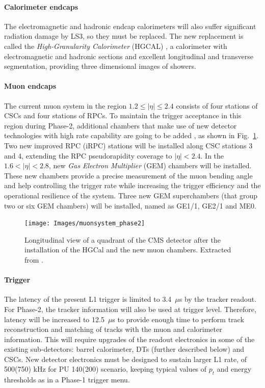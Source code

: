 \documentclass[../main.tex]{subfiles}
\begin{document}
\paragraph{Calorimeter endcaps}

The electromagnetic and hadronic endcap calorimeters will also suffer significant radiation damage by LS3, so they must be replaced. The new replacement is called the \textit{High-Granularity Calorimeter} (HGCAL) \cite{intro:exp:hgcal}, a calorimeter with electromagnetic and hadronic sections and excellent longitudinal and transverse segmentation, providing three dimensional images of showers.

\paragraph{Muon endcaps}

The current muon system in the region $1.2\leq|\eta|\leq2.4$ consists of four stations of CSCs and four stations of RPCs. To maintain the trigger acceptance in this region during Phase-2, additional chambers that make use of new detector technologies with high rate capability are going to be added \cite{muontdr}, as shown in Fig.~\ref{intro:fig:muon_phase2}. Two new improved RPC (iRPC) stations will be installed along CSC stations 3 and 4, extending the RPC pseudorapidity coverage to $|\eta|<2.4$. In the $1.6<|\eta|<2.8$, new \textit{Gas Electron Multiplier} (GEM) chambers will be installed. These new chambers provide a precise measurement of the muon bending angle and help controlling the trigger rate while increasing the trigger efficiency and the operational resilience of the system. Three new GEM superchambers (that group two or six GEM chambers) will be installed, named as GE1/1, GE2/1 and ME0.

\begin{figure}[h!]
\begin{center}
\texttt{[image: Images/muonsystem\_phase2]}
\end{center}
\caption{Longitudinal view of a quadrant of the CMS detector after the installation of the HGCal and the new muon chambers. Extracted from \cite{l1tdr}.}
\label{intro:fig:muon_phase2}
\end{figure}


\paragraph{Trigger}

The latency of the present L1 trigger is limited to 3.4~$\mu$s by the tracker readout. For Phase-2, the tracker information will also be used at trigger level. Therefore, latency will be increased to 12.5~$\mu$s to provide enough time to perform track reconstruction and matching of tracks with the muon and calorimeter information. This will require upgrades of the readout electronics in some of the existing sub-detectors: barrel calorimeter, DTs (further described below) and CSCs. New detector electronics must be designed to sustain larger L1 rate, of 500(750) kHz for PU 140(200) scenario, keeping typical values of $p_t$ and energy thresholds as in a Phase-1 trigger menu.
\end{document}
